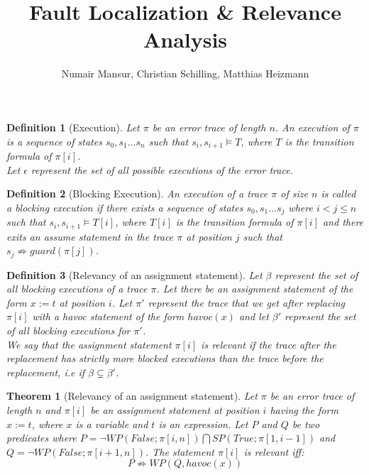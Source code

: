 \documentclass{article}
\title{Fault Localization \& Relevance Analysis \\ }
\author{Numair Mansur, Christian Schilling, Matthias Heizmann}
\affil{University of Freiburg, Germany}
\newcommand{\limp}{\Rightarrow}
\newtheorem{mydef}{Definition}
\newtheorem{theorem}{Theorem}
\begin{document}
\maketitle
\begin{mydef}[Execution]\label{mydef:execution_definition}
Let $\pi$ be an error trace of length $n$. An execution of $\pi$ is a sequence of states $s_0, s_1...s_n$ such that $s_i, s_{i+1} \models T$, where $T$ is the transition formula of $\pi[i]$. \\
Let $\epsilon$ represent the set of all possible executions of the error trace.
\end{mydef}

\begin{mydef}[Blocking Execution]\label{mydef:blockingexecution_definition}
An execution of a trace $\pi$ of size $n$ is called a blocking execution if there exists a sequence of states $s_0, s_1...s_j$ where $i<j \leq n$ such that $s_i, s_{i+1} \models T[i]$, where $T[i]$ is the transition formula of $\pi[i]$ and there exits an assume statement in the trace $\pi$ at position $j$ such that $s_{j} \not \limp guard(\pi[j])$.
\end{mydef}

\begin{mydef}[Relevancy of an assignment statement]\label{mydef:relevancy_definition}
Let $\beta$ represent the set of all blocking executions of a trace $\pi$. Let there be an assignment statement of the form $x:=t$ at position $i$. Let $\pi'$ represent the trace that we get after replacing $\pi[i]$ with a havoc statement of the form $havoc(x)$ and let $\beta'$ represent the set of all blocking executions for $\pi'$.\\
We say that the assignment statement $\pi[i]$ is relevant if the trace after the replacement has strictly more blocked executions than the trace before the replacement, i.e if $\beta \subsetneq \beta'$. 
\end{mydef}
\newpage

\begin{theorem}[Relevancy of an assignment statement]\label{mydef:relevancytheorem}
Let $\pi$ be an error trace of length $n$ and $\pi[i]$ be an assignment statement at position $i$ having the form $x:=t$, where $x$ is a variable and $t$ is an expression. Let $P$ and $Q$ be two predicates where $P = \neg WP(False; \pi[i,n]) \bigcap SP(True; \pi[1, i-1])$ and $Q =  \neg WP(False; \pi[i+1,n])$. The statement $\pi[i]$ is relevant iff:
 $$P \not \limp WP(Q,havoc(x))$$
\end{theorem}
\end{document}
